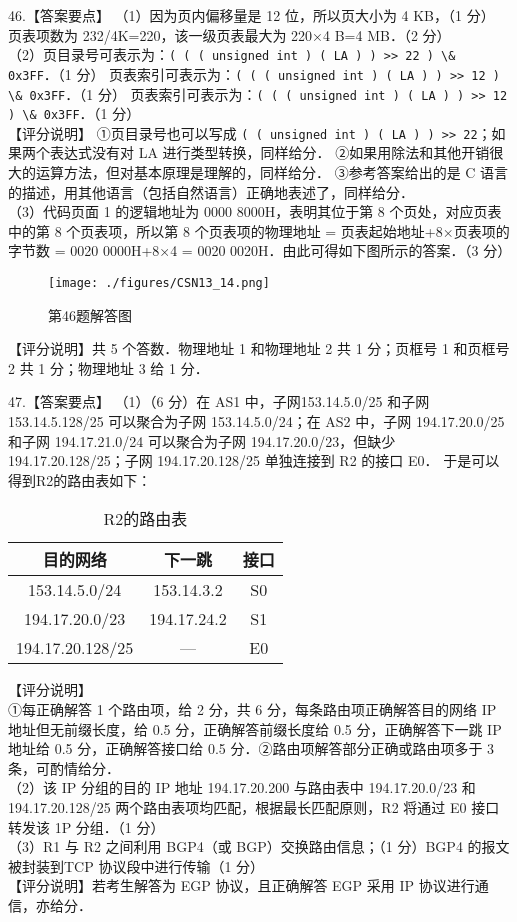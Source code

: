 46.【答案要点】
（1）因为页内偏移量是 12 位，所以页大小为 4 KB，（1 分） 页表项数为 232/4K=220，该一级页表最大为 220×4 B=4 MB．（2 分）  \\
（2）页目录号可表示为：\verb|( ( ( unsigned int ) ( LA ) ) >> 22 ) \& 0x3FF|．（1 分）        页表索引可表示为：\verb|( ( ( unsigned int ) ( LA ) ) >> 12 ) \& 0x3FF|．（1 分）        页表索引可表示为：\verb|( ( ( unsigned int ) ( LA ) ) >> 12 ) \& 0x3FF|．（1 分） \\
【评分说明】 
①页目录号也可以写成 \verb|( ( unsigned int ) ( LA ) ) >> 22|；如果两个表达式没有对 LA 进行类型转换，同样给分． 
②如果用除法和其他开销很大的运算方法，但对基本原理是理解的，同样给分． 
③参考答案给出的是 C 语言的描述，用其他语言（包括自然语言）正确地表述了，同样给分．  \\
（3）代码页面 1 的逻辑地址为 0000 8000H，表明其位于第 8 个页处，对应页表中的第 8 个页表项，所以第 8 个页表项的物理地址 = 页表起始地址+8×页表项的字节数 = 0020 
0000H+8×4 = 0020 0020H．由此可得如下图所示的答案．（3 分）
\begin{figure}[ht]
\centering
\texttt{[image: ./figures/CSN13\_14.png]}
\caption{第46题解答图} \label{CSN13_fig14}
\end{figure}
【评分说明】共 5 个答数．物理地址 1 和物理地址 2 共 1 分；页框号 1 和页框号 2 共 1 分；物理地址 3 给 1 分．

47.【答案要点】 
  （1）（6 分）在 AS1 中，子网153.14.5.0/25 和子网 153.14.5.128/25 可以聚合为子网
153.14.5.0/24；在 AS2 中，子网 194.17.20.0/25 和子网 194.17.21.0/24 可以聚合为子网 194.17.20.0/23，但缺少 194.17.20.128/25；子网 194.17.20.128/25 单独连接到 R2 的接口 E0． 
于是可以得到R2的路由表如下：
\begin{table}[ht]
\centering
\caption{R2的路由表}\label{CSN13_tab9}
\begin{tabular}{|c|c|c|}
\hline
目的网络 & 下一跳 & 接口  \\
\hline
153.14.5.0/24 & 153.14.3.2 & S0  \\
\hline
194.17.20.0/23 & 194.17.24.2 & S1  \\
\hline
194.17.20.128/25 & — & E0  \\
\hline
\end{tabular}
\end{table}
【评分说明】 \\
①每正确解答 1 个路由项，给 2 分，共 6 分，每条路由项正确解答目的网络 IP 地址但无前缀长度，给 0.5 分，正确解答前缀长度给 0.5 分，正确解答下一跳 IP 地址给 0.5 分，正确解答接口给 0.5 分．②路由项解答部分正确或路由项多于 3 条，可酌情给分． \\
（2）该 IP 分组的目的 IP 地址 194.17.20.200 与路由表中 194.17.20.0/23 和 194.17.20.128/25 两个路由表项均匹配，根据最长匹配原则，R2 将通过 E0 接口转发该 1P 分组．（1 分） \\
（3）R1 与 R2 之间利用 BGP4（或 BGP）交换路由信息；（1 分）BGP4 的报文被封装到TCP 协议段中进行传输（1 分） \\
【评分说明】若考生解答为 EGP 协议，且正确解答 EGP 采用 IP 协议进行通信，亦给分． 